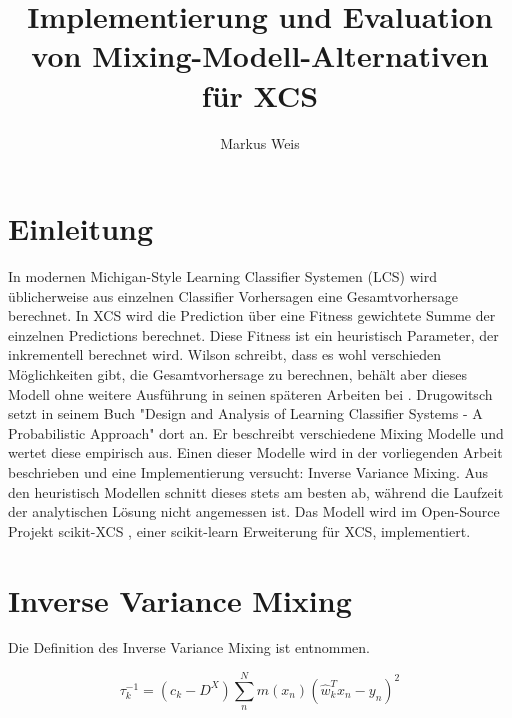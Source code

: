 \documentclass{ocsmnar}
\begin{document}
\title{Implementierung und Evaluation von Mixing-Modell-Alternativen für XCS}


\author{Markus Weis}

\maketitle




\section{Einleitung}
In modernen Michigan-Style Learning Classifier Systemen (LCS) wird üblicherweise aus einzelnen Classifier Vorhersagen eine Gesamtvorhersage berechnet. In XCS wird die Prediction über eine Fitness gewichtete Summe der einzelnen Predictions berechnet. Diese Fitness ist ein heuristisch Parameter, der inkrementell berechnet wird. Wilson schreibt, dass es wohl verschieden Möglichkeiten gibt, die Gesamtvorhersage zu berechnen, behält aber dieses Modell ohne weitere Ausführung in seinen späteren Arbeiten bei \cite{Wilson95}. 
Drugowitsch setzt in seinem Buch "Design and Analysis of Learning Classifier Systems - A Probabilistic Approach" \cite{book} dort an. Er beschreibt verschiedene Mixing Modelle und wertet diese empirisch aus. 
Einen dieser Modelle wird in der vorliegenden Arbeit beschrieben und eine Implementierung versucht: Inverse Variance Mixing. Aus den heuristisch Modellen schnitt dieses stets am besten ab, während die Laufzeit der  analytischen Lösung nicht angemessen ist. Das Modell wird im Open-Source Projekt scikit-XCS \cite{repo}, einer scikit-learn Erweiterung für XCS, implementiert. 

\section{Inverse Variance Mixing}
Die Definition des Inverse Variance Mixing ist \cite{book} entnommen. 

$$ \tau_{k}^{-1} = (c_{k} - D^{X}) \sum_{n}^{N} m(x_{n}) (\hat{w}_{k}^T x_{n} - y_{n})^{2} $$
\end{document}
